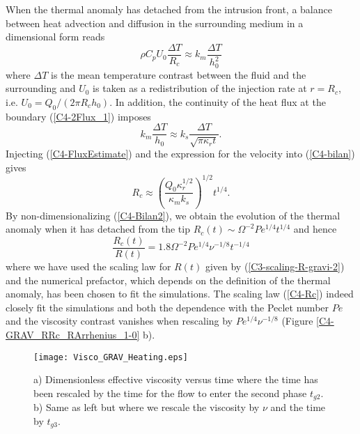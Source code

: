 When  the thermal  anomaly has  detached from  the intrusion  front, a
balance between heat advection and diffusion in the surrounding medium
in a dimensional form reads
\begin{equation}
  \rho C_p U_0 \frac{\Delta T}{R_c} \approx k_m \frac{\Delta T}{h_0^2}
  \label{C4-bilan}
\end{equation}
where $\Delta  T$ is the  mean temperature contrast between  the fluid
and the  surrounding and  $U_0$ is  taken as  a redistribution  of the
injection rate at $r=R_c$, i.e. $U_0=Q_0/(2\pi R_c h_0)$. In addition,
the continuity  of the  heat flux  at the  boundary (\ref{C4-2Flux_1})
imposes
\begin{equation}
  k_m\frac{\Delta   T}{h_0}\approx   k_s   \frac{\Delta   T}{\sqrt{\pi
      \kappa_r t}}.
  \label{C4-FluxEstimate}
\end{equation}
Injecting (\ref{C4-FluxEstimate}) and the  expression for the velocity
into (\ref{C4-bilan}) gives
\begin{equation}
  R_c \approx  \left(\frac{Q_0\kappa_r^{1/2}}{\kappa_m k_s}\right)^{1/2}
  t^{1/4}.
  \label{C4-Bilan2}
\end{equation}
By non-dimensionalizing (\ref{C4-Bilan2}), we  obtain the evolution of
the   thermal   anomaly   when   it  has   detached   from   the   tip
$R_c(t)\sim \Omega^{-2}Pe^{1/4}t^{1/4}$ and hence
\begin{equation}
  \frac{R_c(t)}{R(t)} = 1.8\Omega^{-2}Pe^{1/4}\nu^{-1/8}t^{-1/4}
  \label{C4-Rc}
\end{equation}
where   we  have   used  the   scaling   law  for   $R(t)$  given   by
(\ref{C3-scaling-R-gravi-2})  and   the  numerical   prefactor,  which
depends on the  definition of the thermal anomaly, has  been chosen to
fit the simulations. The scaling  law (\ref{C4-Rc}) indeed closely fit
the simulations  and both the  dependence with the Peclet  number $Pe$
and   the    viscosity   contrast    vanishes   when    rescaling   by
$Pe^{1/4}\nu^{-1/8}$ (Figure \ref{C4-GRAV_RRc_RArrhenius_1-0} b).

\begin{figure}[h!]
  \begin{center}
    \graphicspath{ {/Users/thorey/Documents/These/Projet/Refroidissement/Skin_Model/Figure/Figure_Heating/} }
    \texttt{[image: Visco\_GRAV\_Heating.eps]}
    \caption{a)  Dimensionless effective  viscosity versus  time where
      the time has been rescaled by the time for the flow to enter the
      second phase $t_{g2}$. b) Same as  left but where we rescale the
      viscosity by $\nu$ and the time by $t_{g3}$.}
    \label{C4-Visco_GRAV_Heating}
  \end{center}
\end{figure}

